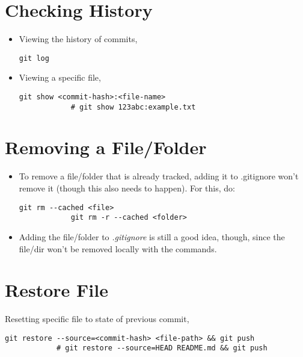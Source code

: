 \documentclass[12pt, a4paper]{scrbook}
\numberwithin{equation}{section}
\theoremstyle{definition}
\theoremstyle{definition}
\begin{document}
	\section{Checking History}

	\begin{itemize}
		\item Viewing the history of commits,
		
		\begin{lstlisting}[style=mystylebash, label=alg:history1, xleftmargin=\parindent]
			git log
		\end{lstlisting}
	
		\item Viewing a specific file,
		
		\begin{lstlisting}[style=mystylebash, label=alg:history2, xleftmargin=\parindent]
			git show <commit-hash>:<file-name>
			# git show 123abc:example.txt
		\end{lstlisting}
	
	\end{itemize}
	
	\section{Removing a File/Folder}
	
	\begin{itemize}
		\item To remove a file/folder that is already tracked, adding it to .gitignore won’t remove it (though this also needs to happen). For this, do:
		
		\begin{lstlisting}[style=mystylebash, label=alg:git_remove, xleftmargin=\parindent]
			git rm --cached <file>
			git rm -r --cached <folder>
		\end{lstlisting}

		\item Adding the file/folder to \textit{.gitignore} is still a good idea, though, since the file/dir won’t be removed locally with the commands.
	\end{itemize}
	
	\section{Restore File}
	
		Resetting specific file to state of previous commit,
		
		\begin{lstlisting}[style=mystylebash, label=alg:git_restore, xleftmargin=\parindent]
			git restore --source=<commit-hash> <file-path> && git push
			# git restore --source=HEAD README.md && git push
		\end{lstlisting}
	
\end{document}
